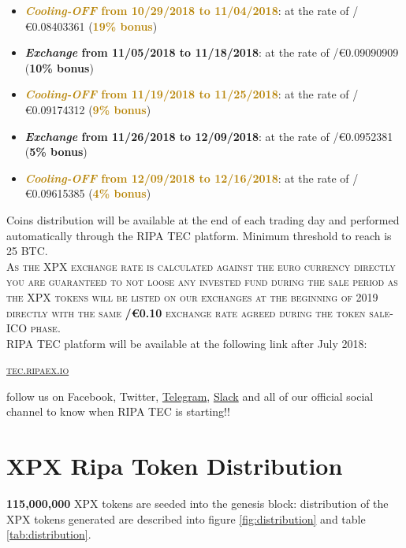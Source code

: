 \documentclass[11pt,fleqn,oneside]{book} %
\begin{document}
\begin{itemize}
	\item \textcolor{darkgoldenrod}{\textbf{\textit{Cooling-OFF} from 10/29/2018 to 11/04/2018}}: 
	at the rate of \PHP/\euro0.08403361 (\textcolor{darkgoldenrod}{\textbf{19\% bonus}})
	\item \textcolor{airforceblue}{\textbf{\textit{Exchange} from 11/05/2018 to 11/18/2018}}: at the rate of \PHP/\euro0.09090909 (\textcolor{airforceblue}{\textbf{10\% bonus}})
	\item \textcolor{darkgoldenrod}{\textbf{\textit{Cooling-OFF} from 11/19/2018 to 11/25/2018}}: 
	at the rate of \PHP/\euro0.09174312 (\textcolor{darkgoldenrod}{\textbf{9\% bonus}})
	\item \textcolor{airforceblue}{\textbf{\textit{Exchange} from 11/26/2018 to 12/09/2018}}: at the rate of \PHP/\euro0.0952381 (\textcolor{airforceblue}{\textbf{5\% bonus}})
	\item \textcolor{darkgoldenrod}{\textbf{\textit{Cooling-OFF} from 12/09/2018 to 12/16/2018}}: 
	at the rate of \PHP/\euro0.09615385 (\textcolor{darkgoldenrod}{\textbf{4\% bonus}})
\end{itemize}
\vspace{5mm}
Coins distribution will be available at the end of each trading day and performed automatically through the RIPA TEC platform. Minimum
threshold to reach is 25 BTC.\\

\textsc{As the XPX exchange rate is calculated against the euro currency directly you are guaranteed to not loose any invested fund
during the sale period as the XPX tokens will be listed on our exchanges at the beginning of 2019 directly with the same \textbf{\PHP/\euro0.10}
exchange rate agreed during the token sale-ICO phase}.\\

RIPA TEC platform will be available at the following link after July 2018:
\begin{center}
	\href{https://tec.ripaex.io}{\textsc{tec.ripaex.io}}
\end{center}
follow us on Facebook, Twitter, 
\href{https://t.me/ripaex}{Telegram}, 
\href{https://join.slack.com/t/ripaex/shared_invite/enQtMzM4NzUwNjU4OTQ0LTY3MDJmMTdhYTNlZjJlNGUxNzM1YjUwYjgyYjZlMDJmOTg3NTIzNThmNTYyMGQ3ODBkOTRmYzk3Y2Y4MzBkOTY}{Slack}
and all of our official social channel to know when RIPA TEC is starting!!

\section{XPX Ripa Token Distribution}
\textbf{115,000,000} XPX tokens are seeded into the genesis block: distribution of the XPX tokens generated are described into
figure \ref{fig:distribution} and table \ref{tab:distribution}.
\end{document}

